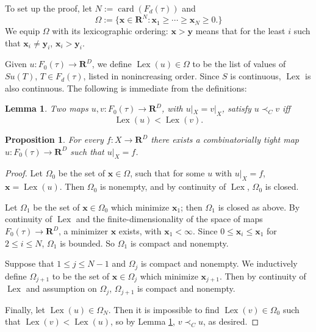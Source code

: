 \documentclass[reqno,11pt]{amsart}
\newcommand{\RR}{\mathbf{R}}
\DeclareMathOperator{\card}{card}
\DeclareMathOperator{\Lex}{Lex}
\newtheorem{lemma}[theorem]{Lemma}
\newtheorem{proposition}[theorem]{Proposition}
\theoremstyle{definition}
\numberwithin{equation}{section}
\begin{document}
To set up the proof, let $N := \card(F_d(\tau))$ and
$$\Omega := \{\mathbf x \in \RR^N: \mathbf x_1 \geq \cdots \geq \mathbf x_N \geq 0.\}$$
We equip $\Omega$ with its lexicographic ordering: $\mathbf x > \mathbf y$ means that for the least $i$ such that $\mathbf x_i \neq \mathbf y_i$, $\mathbf x_i > \mathbf y_i$.

Given $u: F_0(\tau) \to \RR^D$, we define $\Lex(u) \in \Omega$ to be the list of values of $Su(T)$, $T \in F_d(\tau)$, listed in nonincreasing order.
Since $S$ is continuous, $\Lex$ is also continuous. 
The following is immediate from the definitions:

\begin{lemma}\label{combinatorially tight means lexicographic}
Two maps $u, v: F_0(\tau) \to \RR^D$, with $u|_X = v|_X$, satisfy $u \prec_C v$ iff
$$\Lex(u) < \Lex(v).$$
\end{lemma}

\begin{proposition}\label{combinatorially tight existence}
For every $f: X \to \RR^D$ there exists a combinatorially tight map $u: F_0(\tau) \to \RR^D$ such that $u|_X = f$.
\end{proposition}
\begin{proof}
Let $\Omega_0$ be the set of $\mathbf x \in \Omega$, such that for some $u$ with $u|_X = f$, $\mathbf x = \Lex(u)$.
Then $\Omega_0$ is nonempty, and by continuity of $\Lex$, $\Omega_0$ is closed.

Let $\Omega_1$ be the set of $\mathbf x \in \Omega_0$ which minimize $\mathbf x_1$; then $\Omega_1$ is closed as above.
By continuity of $\Lex$ and the finite-dimensionality of the space of maps $F_0(\tau) \to \RR^D$, a minimizer $\mathbf x$ exists, with $\mathbf x_1 < \infty$.
Since $0 \leq \mathbf x_i \leq \mathbf x_1$ for $2 \leq i \leq N$, $\Omega_1$ is bounded.
So $\Omega_1$ is compact and nonempty.

Suppose that $1 \leq j \leq N - 1$ and $\Omega_j$ is compact and nonempty.
We inductively define $\Omega_{j + 1}$ to be the set of $\mathbf x \in \Omega_j$ which minimize $\mathbf x_{j + 1}$.
Then by continuity of $\Lex$ and assumption on $\Omega_j$, $\Omega_{j + 1}$ is compact and nonempty.

Finally, let $\Lex(u) \in \Omega_N$.
Then it is impossible to find $\Lex(v) \in \Omega_0$ such that $\Lex(v) < \Lex(u)$, so by Lemma \ref{combinatorially tight means lexicographic}, $v \prec_C u$, as desired.
\end{proof}
\end{document}
